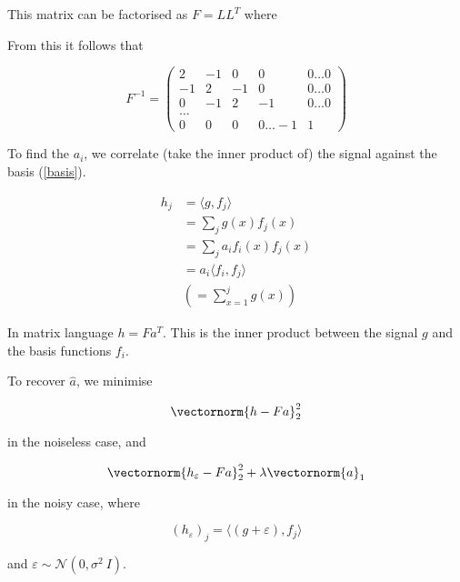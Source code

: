 This matrix can be factorised as \(F = LL^T\) where 


From this it follows that

\begin{equation}
F^{-1} = \begin{pmatrix}
 2 & -1 & 0 & 0  & 0 \ldots 0 \\
  -1 & 2 & -1 & 0  & 0 \ldots 0\\
     0 & -1 & 2 & -1  & 0 \ldots0  \\
    \ldots  \\
     0 & 0 & 0 & 0  \ldots -1 & 1 
\end{pmatrix}
\end{equation}

To find the \(a_i\), we correlate (take the inner product of) the signal against the basis (\ref{basis}).

\begin{definition}
\begin{align}
h_j &= \langle g, f_j \rangle \\
&= \sum_j g\left(x\right) f_j\left(x\right) \\
&= \sum_j a_i f_i\left(x\right) f_j\left(x\right) \\
&= a_i \langle f_i, f_j\rangle \\
&\left(= \sum_{x=1}^j g\left(x\right)\right)
\end{align}

In matrix language \(h = F a^T\). This is the inner product between the signal \(g\) and the basis functions \(f_i\).
\end{definition}

To recover \(\hat{a}\), we minimise

\begin{equation}
\vectornorm{h - Fa}_2^2
\end{equation}

in the noiseless case, and

\begin{equation}
\vectornorm{h_\varepsilon - Fa}_2^2 + \lambda\vectornorm{a}_1
\label{recon}
\end{equation}

in the noisy case, where 

\begin{equation}
\left(h_\varepsilon\right)_j = \langle\left(g+\varepsilon\right), f_j\rangle
\end{equation}

and \(\varepsilon \sim \mathcal{N}(0,\sigma^2\ I)\).

